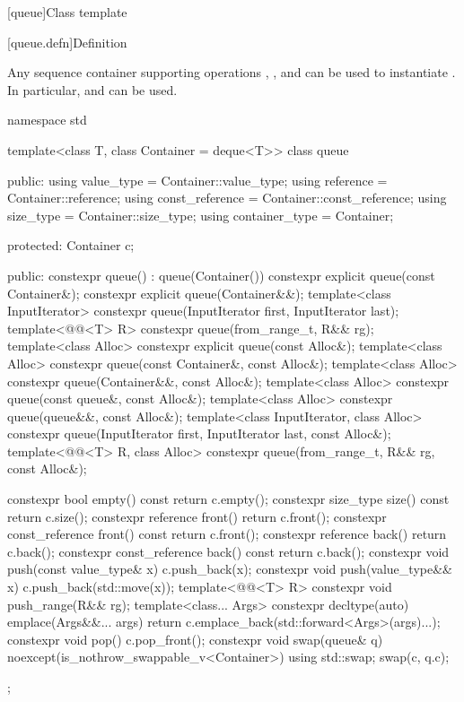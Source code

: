 [queue]{Class template }

[queue.defn]{Definition}

\pnum
{}%
Any sequence container supporting operations
,
,
and
can be used to instantiate
.
In particular,
and
can be used.

\begin{codeblock}
namespace std {
  template<class T, class Container = deque<T>>
  class queue {
  public:
    using value_type      = Container::value_type;
    using reference       = Container::reference;
    using const_reference = Container::const_reference;
    using size_type       = Container::size_type;
    using container_type  = Container;

  protected:
    Container c;

  public:
    constexpr queue() : queue(Container()) {}
    constexpr explicit queue(const Container&);
    constexpr explicit queue(Container&&);
    template<class InputIterator> constexpr queue(InputIterator first, InputIterator last);
    template<@@<T> R> constexpr queue(from_range_t, R&& rg);
    template<class Alloc> constexpr explicit queue(const Alloc&);
    template<class Alloc> constexpr queue(const Container&, const Alloc&);
    template<class Alloc> constexpr queue(Container&&, const Alloc&);
    template<class Alloc> constexpr queue(const queue&, const Alloc&);
    template<class Alloc> constexpr queue(queue&&, const Alloc&);
    template<class InputIterator, class Alloc>
      constexpr queue(InputIterator first, InputIterator last, const Alloc&);
    template<@@<T> R, class Alloc>
      constexpr queue(from_range_t, R&& rg, const Alloc&);

    constexpr bool              empty() const     { return c.empty(); }
    constexpr size_type         size()  const     { return c.size(); }
    constexpr reference         front()           { return c.front(); }
    constexpr const_reference   front() const     { return c.front(); }
    constexpr reference         back()            { return c.back(); }
    constexpr const_reference   back() const      { return c.back(); }
    constexpr void push(const value_type& x)      { c.push_back(x); }
    constexpr void push(value_type&& x)           { c.push_back(std::move(x)); }
    template<@@<T> R> constexpr void push_range(R&& rg);
    template<class... Args>
      constexpr decltype(auto) emplace(Args&&... args)
        { return c.emplace_back(std::forward<Args>(args)...); }
    constexpr void pop()                          { c.pop_front(); }
    constexpr void swap(queue& q) noexcept(is_nothrow_swappable_v<Container>)
      { using std::swap; swap(c, q.c); }
  };

}
\end{codeblock}
